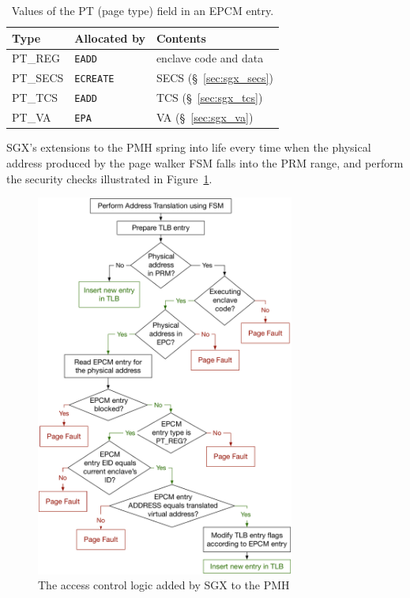 \begin{table}[hbt]
  \centering
  \begin{tabularx}{\columnwidth}{| l | l | X |}
  \hline
  \textbf{Type} & \textbf{Allocated by} & \textbf{Contents}\\
  \hline
  PT\_REG & \texttt{EADD} & enclave code and data \\
  \hline
  PT\_SECS & \texttt{ECREATE} & SECS (\S~\ref{sec:sgx_secs}) \\
  \hline
  PT\_TCS & \texttt{EADD} & TCS (\S~\ref{sec:sgx_tcs}) \\
  \hline
  PT\_VA & \texttt{EPA} & VA (\S~\ref{sec:sgx_va}) \\
  \hline
  \end{tabularx}
  \caption{Values of the PT (page type) field in an EPCM entry.}
  \label{fig:sgx_pt_values}
\end{table}

SGX's extensions to the PMH spring into life every time when the physical
address produced by the page walker FSM falls into the PRM range, and perform
the security checks illustrated in Figure~\ref{fig:sgx_tlb_miss_checks}.

\begin{figure}[hbt]
  \centering
  \includegraphics[width=85mm]{figures/sgx_tlb_miss_checks.pdf}
  \caption{
    The access control logic added by SGX to the PMH
  }
  \label{fig:sgx_tlb_miss_checks}
\end{figure}

